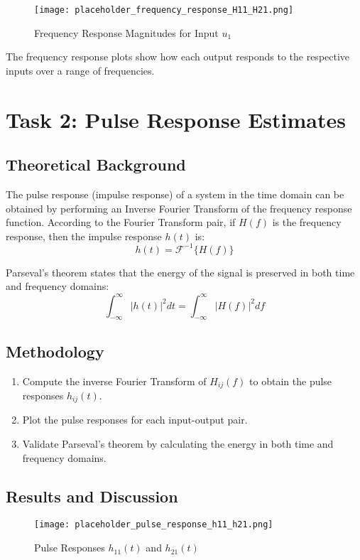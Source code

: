 \documentclass[12pt]{article}
\begin{document}
\begin{figure}[H]
    \centering
    \texttt{[image: placeholder\_frequency\_response\_H11\_H21.png]}
    \caption{Frequency Response Magnitudes for Input $u_1$}
    \label{fig:frequency_response_u1}
\end{figure}

The frequency response plots show how each output responds to the respective inputs over a range of frequencies.

\section{Task 2: Pulse Response Estimates}
\subsection{Theoretical Background}
The pulse response (impulse response) of a system in the time domain can be obtained by performing an Inverse Fourier Transform of the frequency response function. According to the Fourier Transform pair, if $H(f)$ is the frequency response, then the impulse response $h(t)$ is:
\begin{equation}
    h(t) = \mathcal{F}^{-1}\{H(f)\}
\end{equation}

Parseval's theorem states that the energy of the signal is preserved in both time and frequency domains:
\begin{equation}
    \int_{-\infty}^{\infty} |h(t)|^2 dt = \int_{-\infty}^{\infty} |H(f)|^2 df
\end{equation}

\subsection{Methodology}
\begin{enumerate}
    \item Compute the inverse Fourier Transform of $H_{ij}(f)$ to obtain the pulse responses $h_{ij}(t)$.
    \item Plot the pulse responses for each input-output pair.
    \item Validate Parseval's theorem by calculating the energy in both time and frequency domains.
\end{enumerate}

\subsection{Results and Discussion}
\begin{figure}[H]
    \centering
    \texttt{[image: placeholder\_pulse\_response\_h11\_h21.png]}
    \caption{Pulse Responses $h_{11}(t)$ and $h_{21}(t)$}
    \label{fig:pulse_response_u1}
\end{figure}
\end{document}
